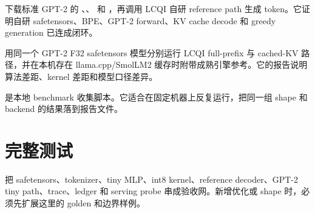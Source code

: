 

 下载标准 GPT-2 的 、、 和 ，再调用 LCQI 自研  reference path 生成 token。它证明自研 safetensors、BPE、GPT-2 forward、KV cache decode 和 greedy generation 已连成闭环。



 用同一个 GPT-2 F32 safetensors 模型分别运行 LCQI full-prefix 与 cached-KV 路径，并在本机存在 llama.cpp/SmolLM2 缓存时附带成熟引擎参考。它的报告说明算法差距、kernel 差距和模型口径差异。



 是本地 benchmark 收集脚本。它适合在固定机器上反复运行，把同一组 shape 和 backend 的结果落到报告文件。



\section{完整测试}

 把 safetensors、tokenizer、tiny MLP、int8 kernel、reference decoder、GPT-2 tiny path、trace、ledger 和 serving probe 串成验收网。新增优化或 shape 时，必须先扩展这里的 golden 和边界样例。


